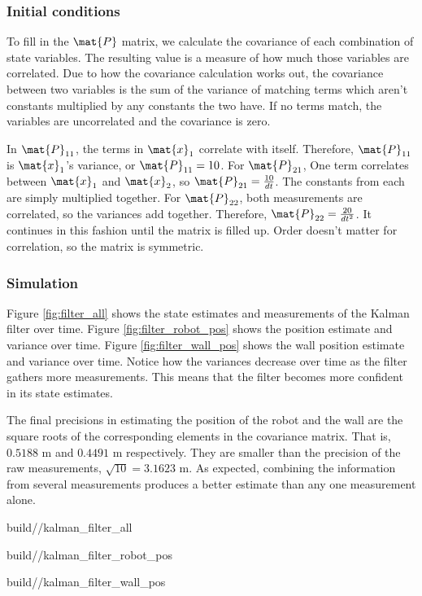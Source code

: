 \subsubsection{Initial conditions}

To fill in the $\mat{P}$ matrix, we calculate the covariance of each combination
of \gls{state} variables. The resulting value is a measure of how much those
variables are correlated. Due to how the covariance calculation works out, the
covariance between two variables is the sum of the variance of matching terms
which aren't constants multiplied by any constants the two have. If no terms
match, the variables are uncorrelated and the covariance is zero.

In $\mat{P}_{11}$, the terms in $\mat{x}_1$ correlate with itself. Therefore,
$\mat{P}_{11}$ is $\mat{x}_1$'s variance, or $\mat{P}_{11} = 10$. For
$\mat{P}_{21}$, One term correlates between $\mat{x}_1$ and $\mat{x}_2$, so
$\mat{P}_{21} = \frac{10}{dt}$. The constants from each are simply multiplied
together. For $\mat{P}_{22}$, both measurements are correlated, so the variances
add together. Therefore, $\mat{P}_{22} = \frac{20}{dt^2}$. It continues in this
fashion until the matrix is filled up. Order doesn't matter for correlation, so
the matrix is symmetric.

\subsubsection{Simulation}
\label{subsubsec:filter_simulation}

Figure \ref{fig:filter_all} shows the \gls{state} estimates and measurements of
the Kalman filter over time. Figure \ref{fig:filter_robot_pos} shows the
position estimate and variance over time. Figure \ref{fig:filter_wall_pos} shows
the wall position estimate and variance over time. Notice how the variances
decrease over time as the filter gathers more measurements. This means that the
filter becomes more confident in its \gls{state} estimates.

The final precisions in estimating the position of the robot and the wall are
the square roots of the corresponding elements in the covariance matrix. That
is, $0.5188$ m and $0.4491$ m respectively. They are smaller than the precision
of the raw measurements, $\sqrt{10} = 3.1623$ m. As expected, combining the
information from several measurements produces a better estimate than any one
measurement alone.
\begin{svg}{build/\chapterpath/kalman_filter_all}
  \caption{State estimates and measurements with Kalman filter}
  \label{fig:filter_all}
\end{svg}
\begin{svg}{build/\chapterpath/kalman_filter_robot_pos}
  \caption{Robot position estimate and variance with Kalman filter}
  \label{fig:filter_robot_pos}
\end{svg}
\begin{svg}{build/\chapterpath/kalman_filter_wall_pos}
  \caption{Wall position estimate and variance with Kalman filter}
  \label{fig:filter_wall_pos}
\end{svg}

